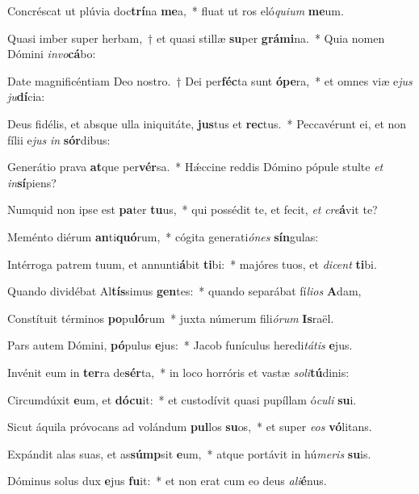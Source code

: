\item Concréscat ut plúvia doc\textbf{trí}na \textbf{me}a,~* fluat ut ros eló\textit{qui}\textit{um} \textbf{me}um.
\item Quasi imber super herbam,~† et quasi stillæ \textbf{su}per \textbf{grá}\textbf{mi}na.~* Quia nomen Dómini \textit{in}\textit{vo}\textbf{cá}bo:
\item Date magnificéntiam Deo nostro.~† Dei per\textbf{féc}ta sunt \textbf{ó}\textbf{pe}ra,~* et omnes viæ e\textit{jus} \textit{ju}\textbf{dí}cia:
\item Deus fidélis, et absque ulla iniquitáte, \textbf{jus}tus et \textbf{rec}tus.~* Peccavérunt ei, et non fílii e\textit{jus} \textit{in} \textbf{sór}dibus:
\item Generátio prava \textbf{at}que per\textbf{vér}sa.~* Hǽccine reddis Dómino pópule stulte \textit{et} \textit{in}\textbf{sí}piens?
\item Numquid non ipse est \textbf{pa}ter \textbf{tu}us,~* qui possédit te, et fecit, \textit{et} \textit{cre}\textbf{á}vit te?
\item Meménto diérum \textbf{an}ti\textbf{quó}rum,~* cógita generati\textit{ó}\textit{nes} \textbf{sín}gulas:
\item Intérroga patrem tuum, et annunti\textbf{á}bit \textbf{ti}bi:~* majóres tuos, et \textit{di}\textit{cent} \textbf{ti}bi.
\item Quando dividébat Al\textbf{tís}simus \textbf{gen}tes:~* quando separábat fí\textit{li}\textit{os} \textbf{A}dam,
\item Constítuit términos \textbf{po}pu\textbf{ló}rum~* juxta númerum fili\textit{ó}\textit{rum} \textbf{Is}raël.
\item Pars autem Dómini, \textbf{pó}pulus \textbf{e}jus:~* Jacob funículus heredi\textit{tá}\textit{tis} \textbf{e}jus.
\item Invénit eum in \textbf{ter}ra de\textbf{sér}ta,~* in loco horróris et vastæ \textit{so}\textit{li}\textbf{tú}dinis:
\item Circumdúxit \textbf{e}um, et \textbf{dó}\textbf{cu}it:~* et custodívit quasi pupíllam ó\textit{cu}\textit{li} \textbf{su}i.
\item Sicut áquila próvocans ad volándum \textbf{pul}los \textbf{su}os,~* et super \textit{e}\textit{os} \textbf{vó}litans.
\item Expándit alas suas, et as\textbf{súmp}sit \textbf{e}um,~* atque portávit in hú\textit{me}\textit{ris} \textbf{su}is.
\item Dóminus solus dux \textbf{e}jus \textbf{fu}it:~* et non erat cum eo deus \textit{a}\textit{li}\textbf{é}nus.
